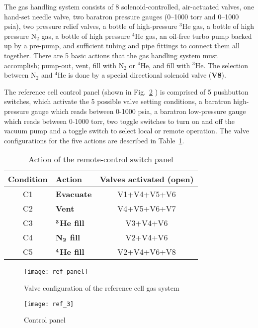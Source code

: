The gas handling system  consists of 8 solenoid-controlled, air-actuated valves,
one hand-set needle valve, two baratron pressure gauges (0--1000 torr
and 0--1000 psia), two pressure relief valves, a  bottle of
high-pressure $^3$He gas, a bottle of high pressure N$_2$ gas,  a
bottle of high pressure $^{4}$He gas, an oil-free turbo pump backed
up by a pre-pump, and sufficient tubing and pipe fittings to
connect them all together.  There are 5 basic actions that the
 gas handling system  must accomplish; pump-out, vent, fill with N$_2$ or $^{4}$He,
and fill with $^3$He.  The selection between N$_2$ and $^{4}$He is
 done by a special directional solenoid valve ({\bf V8}). 

The reference cell control panel (shown in Fig.~\ref{fig:refcell3} ) is comprised of 5 pushbutton
switches, which activate the 5 possible valve setting conditions, a
baratron high-pressure gauge which reads between 0-1000 psia, a
baratron low-pressure gauge which reads between 0-1000 torr, two toggle switches to turn on and off the vacuum pump and a toggle switch to select local or remote operation.  
  The valve configurations for the five  actions  are described in Table~\ref{tab:refcell}.

\begin{table}
\begin{center}
\begin{tabular}{|c|l|c|}
\hline\hline
Condition & Action & Valves activated (open) \rule[-2.5mm]{0mm}{7mm}\\
\hline
C1 & {\bf Evacuate} & V1+V4+V5+V6 \\
C2 & {\bf Vent} & V4+V5+V6+V7 \\
C3 & {\bf $\bf ^3$He fill} & V3+V4+V6 \\
C4 & {\bf N$\bf _2$ fill } & V2+V4+V6 \\
C5 & {\bf $\bf ^4$He fill } & V2+V4+V6+V8 \\
\hline\hline
\end{tabular}
\caption{Action of the remote-control switch panel}
\label{tab:refcell}
\end{center}
\end{table}
\begin{figure}
\begin{center}
\centerline{ \texttt{[image: ref\_panel]}}
\caption{Valve configuration of the reference cell gas system}
\label{fig:refcell2}
\end{center}
\end{figure}

\begin{figure}
\begin{center}
\centerline{\texttt{[image: ref\_3]}}
\caption{Control panel}
\label{fig:refcell3}
\end{center}
\end{figure}



